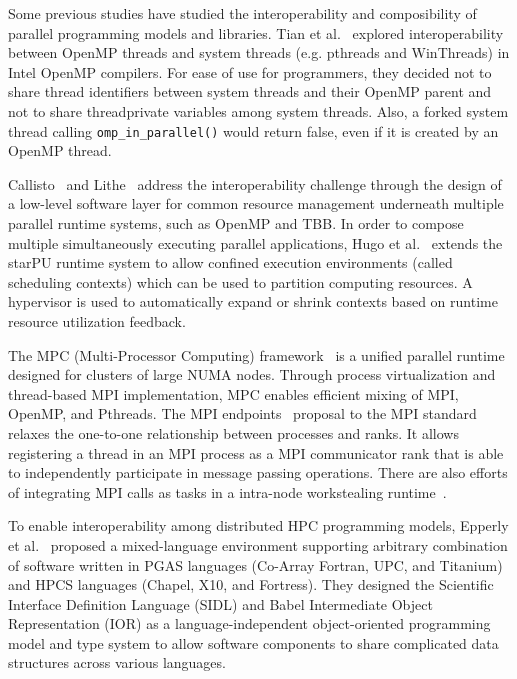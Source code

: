 Some previous studies have studied the interoperability and composibility of parallel programming models and libraries. 
Tian et al.~\cite{tian2003compiler} explored interoperability between OpenMP threads and system threads (e.g. pthreads and WinThreads) in Intel OpenMP compilers.
For ease of use for programmers, they decided not to share thread identifiers between system threads and their OpenMP parent
and not to share threadprivate variables among system threads.
Also, a forked system thread calling \lstinline{omp_in_parallel()} would return false, even if it is created by an OpenMP thread. 

Callisto~\cite{Callisto:Harris:2014:CCP:2592798.2592807} and
Lithe~\cite{Lithe:Pan:2009:LEE:1855591.1855602} 
address the interoperability challenge 
through the design of a low-level software layer for common 
resource management underneath multiple parallel runtime systems, such as OpenMP and TBB. %
In order to compose multiple simultaneously executing parallel applications, Hugo et al.~\cite{hugo2014composing} extends the starPU runtime system to allow confined execution environments (called scheduling contexts) which can be used to partition computing resources. 
A hypervisor is used to automatically expand or shrink contexts based on runtime resource utilization feedback. 

The MPC (Multi-Processor Computing) framework~\cite{perache2008mpc} is a unified parallel runtime designed for clusters of large NUMA nodes. 
Through process virtualization and thread-based MPI implementation, MPC enables efficient mixing of MPI, OpenMP, and Pthreads. 
The MPI endpoints~\cite{Dinan:mpiendpoint_eurompi13}
proposal to the MPI standard relaxes the one-to-one relationship between processes and ranks.
It allows registering a thread in an MPI
process as a MPI communicator rank that is able to independently participate
in message passing operations. There are also efforts of integrating MPI calls as
tasks in a intra-node workstealing runtime~\cite{hcmpi:ipdps13}.

To enable interoperability among distributed HPC programming models, Epperly et al.~\cite{epperly2011composite} proposed a mixed-language environment supporting arbitrary combination of software written in PGAS languages (Co-Array Fortran, UPC, and Titanium) and HPCS languages (Chapel, X10, and Fortress). 
They designed the Scientific Interface Definition Language (SIDL) and Babel Intermediate Object Representation (IOR) as a language-independent object-oriented programming model and type system
to allow software components to share complicated data structures across various languages. 
